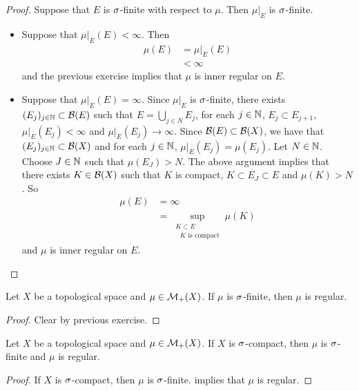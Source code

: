 \documentclass{book}
\begin{document}
	\begin{proof}
		Suppose that $E$ is $\sigma$-finite with respect to $\mu$. Then $\mu|_E$ is $\sigma$-finite.
		\begin{itemize}
			\item Suppose that $\mu|_E(E) < \infty$. Then
			\begin{align*}
				\mu(E) 
				& = \mu|_E(E) \\
				& < \infty
			\end{align*}
			and the previous exercise implies that $\mu$ is inner regular on $E$. \\
			\item Suppose that $\mu|_E(E) = \infty$. Since $\mu|_E$ is $\sigma$-finite, there exists $(E_j)_{j \in \mathbb{N}} \subset \mathcal{B}(E)$ such that $E = \bigcup\limits_{j \in N} E_j$, for each $j \in \mathbb{N}$, $E_j \subset E_{j+1}$, $\mu|_E(E_j) < \infty$ and $\mu|_E(E_j) \rightarrow \infty$. Since $\mathcal{B}(E) \subset \mathcal{B}(X)$, we have that $(E_j)_{j \in \mathbb{N}} \subset \mathcal{B}(X)$ and for each $j \in \mathbb{N}$, $\mu|_E(E_j) = \mu(E_j)$. Let $N \in \mathbb{N}$. Choose $J \in \mathbb{N}$ such that $\mu(E_J) > N$. The above argument implies that there exists $K \in \mathcal{B}(X)$ such that $K$ is compact, $K \subset E_J \subset E$ and $\mu(K) > N$. So 
			\begin{align*}
				\mu(E)
				&= \infty \\
				&= \sup_{\substack{ K \subset E \\ \text{ $K$ is compact}}} \mu(K)
			\end{align*}	 
			and $\mu$ is inner regular on $E$.  
		\end{itemize}
	\end{proof}		
	
	\begin{ex}  
		Let $X$ be a topological space and $\mu \in \mathcal{M}_+(X)$. If $\mu$ is $\sigma$-finite, then $\mu$ is regular.
	\end{ex}
	
	\begin{proof}
		Clear by previous exercise.
	\end{proof}
	
	\begin{ex}  
		Let $X$ be a topological space and $\mu \in \mathcal{M}_+(X)$. If $X$ is $\sigma$-compact, then $\mu$ is $\sigma$-finite and $\mu$ is regular.
	\end{ex}
	
	\begin{proof}
		If $X$ is $\sigma$-compact, then $\mu$ is $\sigma$-finite.  implies that $\mu$ is regular.
	\end{proof}
	
\end{document}
